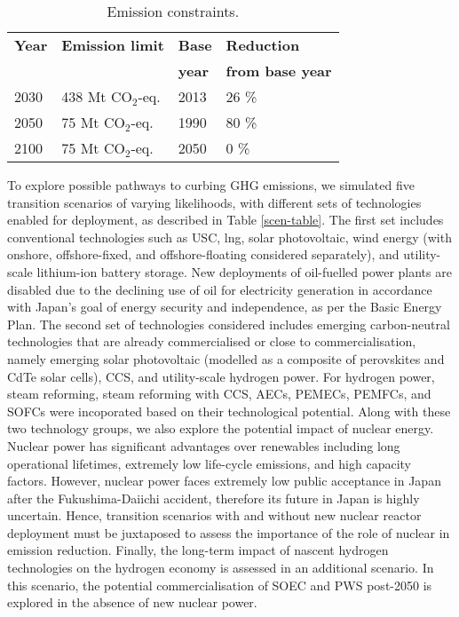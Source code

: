 \begin{table}[!ht]
	\caption{Emission constraints.}
	\vspace{0.1in}
	\begin{tabularx}{0.6\textwidth}{p{} p{}p{} p{}}
		\hline
\textbf{Year} & \textbf{Emission limit} & \textbf{Base} & \textbf{Reduction} \\
 & & \textbf{year} & \textbf{from base year} \\
\hline
2030 & 438 Mt CO$_2$-eq. & 2013 & 26 \% \\
2050 & 75 Mt CO$_2$-eq. & 1990 & 80 \% \\
2100 & 75 Mt CO$_2$-eq. & 2050 & 0 \% \\
\hline 
	\end{tabularx}
\label{co2-limits}
\end{table}

To explore possible pathways to curbing \gls{GHG} emissions, we simulated five transition scenarios of varying likelihoods, with different sets of technologies enabled for deployment, as described in Table \ref{scen-table}. The first set includes conventional technologies such as  \gls{USC}, \gls{lng}, solar photovoltaic, wind energy (with onshore, offshore-fixed, and offshore-floating considered separately), and utility-scale lithium-ion battery storage. New deployments of oil-fuelled power plants are disabled due to the declining use of oil for electricity generation in accordance with Japan's goal of energy security and independence, as per the Basic Energy Plan. The second set of technologies considered includes emerging carbon-neutral technologies that are already commercialised or close to commercialisation, namely emerging solar photovoltaic (modelled as a composite of perovskites and CdTe solar cells), \gls{CCS}, and utility-scale hydrogen power. For hydrogen power, steam reforming, steam reforming with \gls{CCS}, \glspl{AEC}, \glspl{PEMEC}, \glspl{PEMFC}, and \glspl{SOFC} were incoporated based on their technological potential. Along with these two technology groups, we also explore the potential impact of nuclear energy. Nuclear power has significant advantages over renewables including long operational lifetimes, extremely low life-cycle emissions, and high capacity factors. However, nuclear power faces extremely low public acceptance in Japan after the Fukushima-Daiichi accident, therefore its future in Japan is highly uncertain. Hence, transition scenarios with and without new nuclear reactor deployment must be juxtaposed to assess the importance of the role of nuclear in emission reduction. Finally, the long-term impact of nascent hydrogen technologies on the hydrogen economy is assessed in an additional scenario. In this scenario, the potential commercialisation of \gls{SOEC} and \gls{PWS} post-2050 is explored in the absence of new nuclear power.

